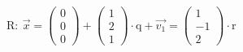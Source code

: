 \documentclass[preview]{standalone}
\begin{document}
\begin{center}
$\mathrm{R: \:} \vec{x} = \begin{pmatrix} 0 \\ 0 \\ 0 \end{pmatrix} + \begin{pmatrix} 1 \\ 2 \\ 1 \end{pmatrix} \cdot \mathrm{q} + \vec{v_1} = \begin{pmatrix} 1 \\ -1 \\ 2 \end{pmatrix} \cdot \mathrm{r}$
\end{center}
\end{document}
